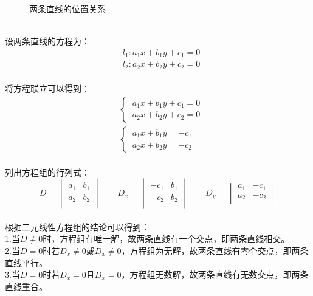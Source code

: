 \documentclass[UTF8]{ctexart}
\begin{document}
\begin{figure}[h]
\begin{center}
{
            }
            \caption{两条直线的位置关系}
        \end{center}
    \end{figure}\\
    设两条直线的方程为：
    \begin{align}
        &l_1:a_1x+b_1y+c_1=0\\[3mm]
        &l_2:a_2x+b_2y+c_2=0
    \end{align}\\
    将方程联立可以得到：
    \begin{align}
        &\begin{cases}
            ~a_1x+b_1y+c_1=0\\[1mm]
            ~a_2x+b_2y+c_2=0
        \end{cases}\\[4mm]
        &\begin{cases}
            ~a_1x+b_1y=-c_1\\[1mm]
            ~a_2x+b_2y=-c_2
        \end{cases}
    \end{align}\\
    列出方程组的行列式：
    \begin{equation}
        D=
        \begin{vmatrix}
            a_{1} & b_{1}\\
            a_{2} & b_{2}\\
        \end{vmatrix}
        \qquad
        D_{x}=
        \begin{vmatrix}
            -c_{1} & b_{1}\\
            -c_{2} & b_{2}\\
        \end{vmatrix}
        \qquad
        D_{y}=
        \begin{vmatrix}
            a_{1} & -c_{1}\\
            a_{2} & -c_{2}\\
        \end{vmatrix}
    \end{equation}\\
    根据二元线性方程组的结论可以得到：\\[3mm]
    1.当$D\neq 0$时，方程组有唯一解，故两条直线有一个交点，即两条直线相交。\\[3mm]
    2.当$D= 0$时若$D_x\neq 0$或$D_x\neq 0$，方程组为无解，故两条直线有零个交点，即两条直线平行。\\[3mm]
    3.当$D= 0$时若$D_x=0$且$D_x=0$，方程组无数解，故两条直线有无数交点，即两条直线重合。
\end{document}
